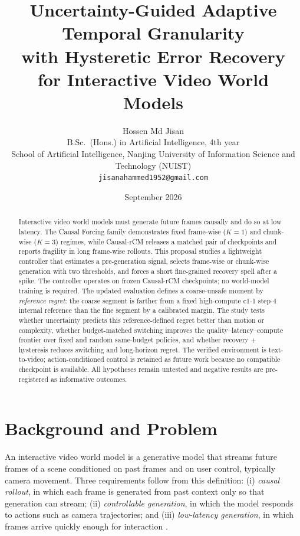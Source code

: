 \documentclass[11pt,a4paper]{article}
\title{\large\bfseries Uncertainty-Guided Adaptive Temporal Granularity\\ with Hysteretic Error Recovery\\ for Interactive Video World Models}
\author{Hossen Md Jisan\\[2pt]
        \small B.Sc.\ (Hons.) in Artificial Intelligence, 4th year\\[2pt]
        \small School of Artificial Intelligence, Nanjing University of Information Science and Technology (NUIST)\\[2pt]
        \small \texttt{jisanahammed1952@gmail.com}}
\date{September 2026}
\begin{document}
\maketitle

\begin{abstract}
\noindent Interactive video world models must generate future frames causally and do so at low latency. The Causal Forcing family demonstrates fixed frame-wise ($K=1$) and chunk-wise ($K=3$) regimes, while Causal-rCM releases a matched pair of checkpoints and reports fragility in long frame-wise rollouts. This proposal studies a lightweight controller that estimates a pre-generation signal, selects frame-wise or chunk-wise generation with two thresholds, and forces a short fine-grained recovery spell after a spike. The controller operates on frozen Causal-rCM checkpoints; no world-model training is required. The updated evaluation defines a coarse-unsafe moment by \emph{reference regret}: the coarse segment is farther from a fixed high-compute c1-1 step-4 internal reference than the fine segment by a calibrated margin. The study tests whether uncertainty predicts this reference-defined regret better than motion or complexity, whether budget-matched switching improves the quality--latency--compute frontier over fixed and random same-budget policies, and whether recovery + hysteresis reduces switching and long-horizon regret. The verified environment is text-to-video; action-conditioned control is retained as future work because no compatible checkpoint is available. All hypotheses remain untested and negative results are pre-registered as informative outcomes.
\end{abstract}

\section{Background and Problem}\label{sec:background}

An interactive video world model is a generative model that streams future frames of a scene conditioned on past frames and on user control, typically camera movement. Three requirements follow from this definition: (i) \emph{causal rollout}, in which each frame is generated from past context only so that generation can stream; (ii) \emph{controllable generation}, in which the model responds to actions such as camera trajectories; and (iii) \emph{low-latency generation}, in which frames arrive quickly enough for interaction \parencite{zhaoMinWMFullStackOpenSource2026a}.
\end{document}
